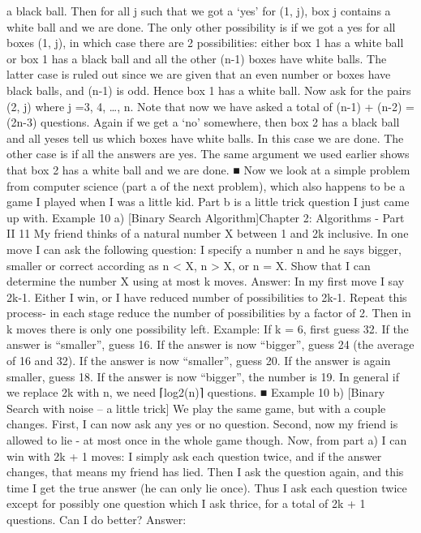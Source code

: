 \documentclass[a4paper,11pt]{book}
\begin{document}
a black ball. Then for all j such that we got a ‘yes’ for (1, j), box j
contains a white ball and we are done. The only other possibility is
if we got a yes for all boxes (1, j), in which case there are 2
possibilities: either box 1 has a white ball or box 1 has a black ball
and all the other (n-1) boxes have white balls. The latter case is
ruled out since we are given that an even number or boxes have
black balls, and (n-1) is odd. Hence box 1 has a white ball. Now ask
for the pairs (2, j) where j =3, 4, …, n. Note that now we have asked
a total of (n-1) + (n-2) = (2n-3) questions. Again if we get a ‘no’
somewhere, then box 2 has a black ball and all yeses tell us which
boxes have white balls. In this case we are done. The other case is
if all the answers are yes. The same argument we used earlier
shows that box 2 has a white ball and we are done. ■
Now we look at a simple problem from computer science (part a
of the next problem), which also happens to be a game I played
when I was a little kid. Part b is a little trick question I just came
up with.
Example 10 a) [Binary Search Algorithm]Chapter 2: Algorithms - Part II 11
My friend thinks of a natural number X between 1 and 2k inclusive.
In one move I can ask the following question: I specify a number n
and he says bigger, smaller or correct according as n < X, n > X, or
n = X. Show that I can determine the number X using at most k
moves.
Answer:
In my first move I say 2k-1. Either I win, or I have reduced number
of possibilities to 2k-1. Repeat this process- in each stage reduce
the number of possibilities by a factor of 2. Then in k moves there
is only one possibility left.
Example: If k = 6, first guess 32. If the answer is “smaller”, guess
16. If the answer is now “bigger”, guess 24 (the average of 16 and
32). If the answer is now “smaller”, guess 20. If the answer is again
smaller, guess 18. If the answer is now “bigger”, the number is 19.
In general if we replace 2k with n, we need ⌈log2(n)⌉ questions. ■
Example 10 b) [Binary Search with noise – a little trick]
We play the same game, but with a couple changes. First, I can
now ask any yes or no question. Second, now my friend is allowed
to lie - at most once in the whole game though. Now, from part a) I
can win with 2k + 1 moves: I simply ask each question twice, and
if the answer changes, that means my friend has lied. Then I ask
the question again, and this time I get the true answer (he can
only lie once). Thus I ask each question twice except for possibly
one question which I ask thrice, for a total of 2k + 1 questions. Can
I do better?
Answer:
\end{document}
